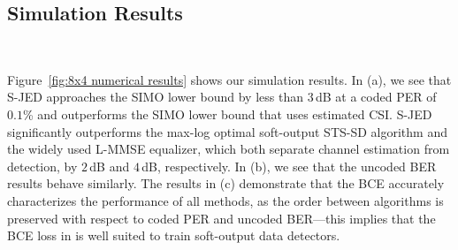 \subsection{Simulation Results}
\begin{figure*}[tp]
\centering
{}
\hspace{0.2cm}
\hspace{0.2cm}
\\
\caption{Coded PER (a), uncoded BER (b), and BCE (c) performance for a $B=8$ BS antenna, $U=4$ UE MU-MIMO system with  transmitting QPSK for $K = 240$ time slots.
%
The proposed soft-output JED (S-JED) algorithm approaches the SIMO lower bound and outperforms the SIMO bound with estimated CSI as well as the max-log optimal soft-output STS-SD and the widely used L-MMSE equalizer which separate channel estimation from  data detection.}
\label{fig:8x4 numerical results}
\vspace{-0.2cm}
\end{figure*}

Figure~\ref{fig:8x4 numerical results} shows our simulation results. 
%
In (a), we see that S-JED approaches the SIMO lower bound by less than $3\,$dB at a coded PER of $0.1$\% and outperforms the SIMO lower bound that uses estimated CSI. 
%
S-JED significantly outperforms the max-log optimal soft-output STS-SD algorithm and the widely used L-MMSE equalizer, which both separate channel estimation from detection, by $2$\,dB and $4$\,dB, respectively.
%
In (b), we see that the uncoded BER results behave similarly. 
%
The results in (c) demonstrate that the BCE accurately characterizes the performance of all methods, as the order between algorithms is preserved with respect to coded PER and uncoded BER---this implies that the BCE loss in  is well suited to train soft-output data detectors. 